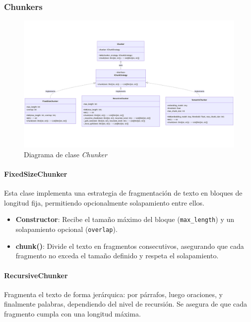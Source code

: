 \documentclass[12pt,letterpaper]{article}
\begin{document}
\subsubsection{Chunkers}

\begin{figure}[htp]
    \centering
    \includegraphics[width=1\linewidth]{img/chunker.png}
    \caption{Diagrama de clase \textit{Chunker}}
    \label{fig:chunker}
\end{figure}

\paragraph{FixedSizeChunker}

Esta clase implementa una estrategia de fragmentación de texto en bloques de longitud fija, permitiendo opcionalmente solapamiento entre ellos.

\begin{itemize}
    \item \textbf{Constructor}: Recibe el tamaño máximo del bloque (\texttt{max\_length}) y un solapamiento opcional (\texttt{overlap}).
    \item \textbf{chunk()}: Divide el texto en fragmentos consecutivos, asegurando que cada fragmento no exceda el tamaño definido y respeta el solapamiento.
\end{itemize}

\paragraph{RecursiveChunker}

Fragmenta el texto de forma jerárquica: por párrafos, luego oraciones, y finalmente palabras, dependiendo del nivel de recursión. Se asegura de que cada fragmento cumpla con una longitud máxima.
\end{document}

